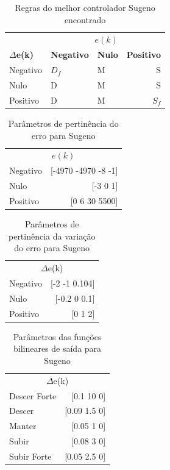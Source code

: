 \documentclass[conference]{IEEEtran}
\begin{document}
\begin{table}[!h]
\caption{Regras do melhor controlador Sugeno encontrado}
\centering
\begin{tabular}{lllr}
\toprule
\multicolumn{3}{r}{\textbf{$e(k)$}} \\
\cmidrule(r){2-4}
\textbf{$\Delta$e(k)} & \textbf{Negativo} & \textbf{Nulo} & \textbf{Positivo} \\
Negativo & $D_f$ & M & S \\
Nulo & D & M & S \\
Positivo & D & M & $S_f$ \\
\bottomrule
\end{tabular}
\end{table}

\begin{table}[!h]
\caption{Parâmetros de pertinência do erro para Sugeno}
\centering
\begin{tabular}{lr}
\toprule
\multicolumn{2}{c}{$e(k)$} \\
\cmidrule(r){1-2}
Negativo & [-4970 -4970 -8 -1] \\
Nulo & [-3 0 1] \\
Positivo & [0 6 30 5500] \\
\bottomrule
\end{tabular}
\end{table}

\begin{table}[!h]
\caption{Parâmetros de pertinência da variação do erro para Sugeno}
\centering
\begin{tabular}{lr}
\toprule
\multicolumn{2}{c}{$\Delta$e(k)} \\
\cmidrule(r){1-2}
Negativo & [-2 -1 0.104] \\
Nulo & [-0.2 0 0.1] \\
Positivo & [0 1 2] \\
\bottomrule
\end{tabular}
\end{table}

\begin{table}[!h]
\caption{Parâmetros das funções bilineares de saída para Sugeno}
\centering
\begin{tabular}{lr}
\toprule
\multicolumn{2}{c}{$\Delta$e(k)} \\
\cmidrule(r){1-2}
Descer Forte & [0.1 10 0] \\
Descer & [0.09 1.5 0] \\
Manter & [0.05 1 0] \\
Subir & [0.08 3 0] \\
Subir Forte & [0.05 2.5 0] \\
\bottomrule
\end{tabular}
\end{table}
\end{document}
